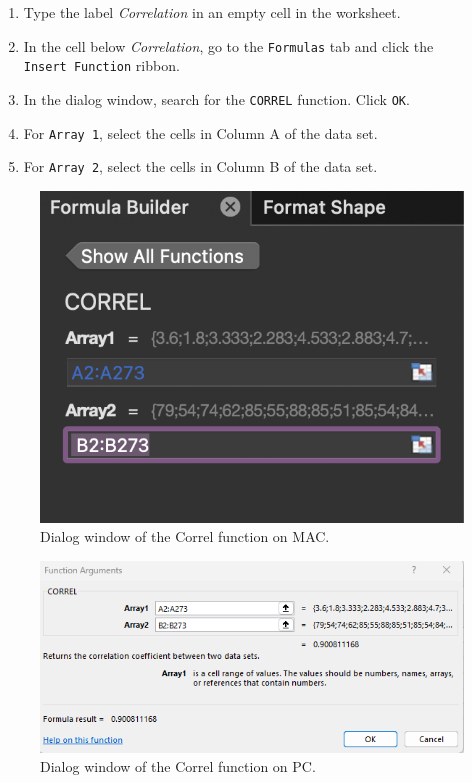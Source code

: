 \documentclass[
]{book}
\providecommand{\tightlist}{%
  \setlength{\itemsep}{0pt}\setlength{\parskip}{0pt}}
\begin{document}
\begin{enumerate}
\def\labelenumi{\arabic{enumi}.}
\tightlist
\item
  Type the label \emph{Correlation} in an empty cell in the worksheet.
\item
  In the cell below \emph{Correlation}, go to the \texttt{Formulas} tab and click the \texttt{Insert\ Function} ribbon.
\item
  In the dialog window, search for the \texttt{CORREL} function. Click \texttt{OK}.
\item
  For \texttt{Array\ 1}, select the cells in Column A of the data set.
\item
  For \texttt{Array\ 2}, select the cells in Column B of the data set.
\end{enumerate}

\begin{figure}

{\centering \includegraphics[width=0.5\linewidth]{images/correl-function-mac} 

}

\caption{Dialog window of the Correl function on MAC.}\label{fig:correl-funciton-mac}
\end{figure}

\begin{figure}

{\centering \includegraphics[width=0.9\linewidth]{images/correl-function-pc} 

}

\caption{Dialog window of the Correl function on PC.}\label{fig:correl-funciton-pc}
\end{figure}
\end{document}

